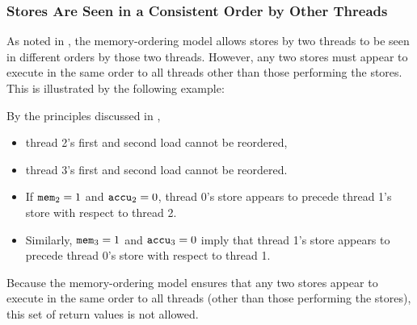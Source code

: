 \newpage

\subsubsection*{Stores Are Seen in a Consistent Order by Other Threads}

As noted in \cite[Section 8.2.3.5]{ref:Intel}, the memory-ordering model allows stores by two threads to be seen in different orders by those two threads.
However, any two stores must appear to execute in the same order to all threads other than those performing the stores.
This is illustrated by the following example:

\begin{table}[!hbt]
\noindent{}
\caption{Stores Are Seen in a Consistent Order by Other Threads \cite[Example 8-7]{ref:Intel}}
\label{tbl:litmus:intel:7}
\end{table}

\noindent
By the principles discussed in \cite[Section 8.2.3.2]{ref:Intel},
\begin{itemize}
  \item thread 2’s first and second load cannot be reordered,
  \item thread 3’s first and second load cannot be reordered.
  \item If $\texttt{mem}_2 = 1$ and $\texttt{accu}_2 = 0$, thread 0’s store appears to precede thread 1’s store with respect to thread 2.
  \item Similarly, $\texttt{mem}_3 = 1$ and $\texttt{accu}_3 = 0$ imply that thread 1’s store appears to precede thread 0’s store with respect to thread 1.
\end{itemize}
Because the memory-ordering model ensures that any two stores appear to execute in the same order to all threads (other than those performing the stores), this set of return values is not allowed.

